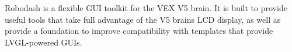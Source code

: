 Robodash is a flexible G\+UI toolkit for the V\+EX V5 brain. It is built to provide useful tools that take full advantage of the V5 brain\textquotesingle{}s L\+CD display, as well as provide a foundation to improve compatibility with templates that provide L\+V\+G\+L-\/powered G\+U\+Is. 